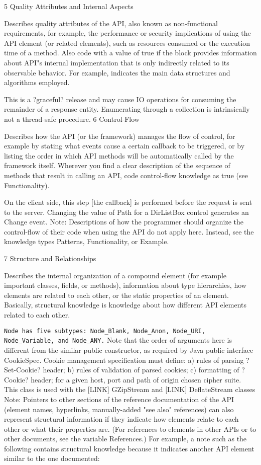 5 Quality Attributes and Internal Aspects

Describes quality attributes of the API, also known as non-functional requirements, for example, the performance or security implications of using the API element (or related elements), such as resources consumed or the execution time of a method. Also code with a value of true if the block provides information about API"s internal implementation that is only indirectly related to its observable behavior. For example, indicates the main data structures and algorithms employed.

This is a ?graceful? release and may cause IO operations for consuming the remainder of a response entity.
Enumerating through a collection is intrinsically not a thread-safe procedure.
6 Control-Flow

Describes how the API (or the framework) manages the flow of control, for example by stating what events cause a certain callback to be triggered, or by listing the order in which API methods will be automatically called by the framework itself. Wherever you find a clear description of the sequence of methods that result in calling an API, code control-flow knowledge as true (see Functionality).

On the client side, this step [the callback] is performed before the request is sent to the server.
Changing the value of Path for a DirListBox control generates an Change event.
Note: Descriptions of how the programmer should organize the control-flow of their code when using the API do not apply here. Instead, see the knowledge types Patterns, Functionality, or Example.

7 Structure and Relationships

Describes the internal organization of a compound element (for example important classes, fields, or methods), information about type hierarchies, how elements are related to each other, or the static properties of an element. Basically, structural knowledge is knowledge about how different API elements related to each other.

\verb|Node has five subtypes: Node_Blank, Node_Anon, Node_URI, Node_Variable, and Node_ANY.|
Note that the order of arguments here is different from the similar public constructor, as required by Java
public interface CookieSpec. Cookie management specification must define: a) rules of parsing ?Set-Cookie? header; b) rules of validation of parsed cookies; c) formatting of ?Cookie? header; for a given host, port and path of origin chosen cipher suite.
This class is used with the [LINK] GZipStream and [LINK] DeflateStream classes
Note: Pointers to other sections of the reference documentation of the API (element names, hyperlinks, manually-added "see also" references) can also represent structural information if they indicate how elements relate to each other or what their properties are. (For references to elements in other APIs or to other documents, see the variable References.) For example, a note such as the following contains structural knowledge because it indicates another API element similar to the one documented:

